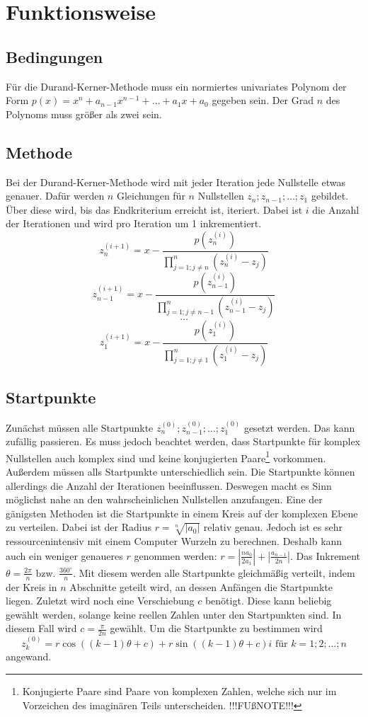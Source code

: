 \documentclass[12pt]{article}
\begin{document}
\section{Funktionsweise}
\subsection{Bedingungen}
Für die Durand-Kerner-Methode muss ein normiertes univariates Polynom der Form $p(x) = x^n + a_{n-1} x^{n-1} + \dots + a_1 x + a_0$ gegeben sein. Der Grad $n$ des Polynoms muss größer als zwei sein.

\subsection{Methode}
Bei der Durand-Kerner-Methode wird mit jeder Iteration jede Nullstelle etwas genauer. Dafür werden $n$ Gleichungen für $n$ Nullstellen $z_n;z_{n-1};\dots;z_1$ gebildet. Über diese wird, bis das Endkriterium erreicht ist, iteriert. Dabei ist $i$ die Anzahl der Iterationen und wird pro Iteration um 1 inkrementiert.
\[z_n^{(i+1)} = x - \frac{p(z_n^{(i)})}{\prod_{j=1;j\neq n}^{n}(z_n^{(i)}-z_j)}\]
\[z_{n-1}^{(i+1)} = x - \frac{p(z_{n-1}^{(i)})}{\prod_{j=1;j\neq n-1}^{n}(z_{n-1}^{(i)}-z_j)}\]
\vspace{0.25mm}
\[\dots\]
\[z_{1}^{(i+1)} = x - \frac{p(z_{1}^{(i)})}{\prod_{j=1;j\neq 1}^{n}(z_{1}^{(i)}-z_j)}\]
\subsection{Startpunkte}
Zunächst müssen alle Startpunkte $z_n^{(0)};z_{n-1}^{(0)};\dots;z_1^{(0)}$ gesetzt werden. Das kann zufällig passieren. Es muss jedoch beachtet werden, dass Startpunkte für komplex Nullstellen auch komplex sind und keine konjugierten Paare\footnote{Konjugierte Paare sind Paare von komplexen Zahlen, welche sich nur im Vorzeichen des imaginären Teils unterscheiden. !!!FUßNOTE!!!} vorkommen. Außerdem müssen alls Startpunkte unterschiedlich sein. Die Startpunkte können allerdings die Anzahl der Iterationen beeinflussen. Deswegen macht es Sinn möglichst nahe an den wahrscheinlichen Nullstellen anzufangen. Eine der gänigsten Methoden ist die Startpunkte in einem Kreis auf der komplexen Ebene zu verteilen. Dabei ist der Radius $r = \sqrt[n]{|a_0|}$ relativ genau. Jedoch ist es sehr ressourcenintensiv mit einem Computer Wurzeln zu berechnen. Deshalb kann auch ein weniger genaueres $r$ genommen werden: $r = |\frac{na_0}{2a_1}| + |\frac{a_{n-1}}{2n}|$.
Das Inkrement $\theta = \frac{2\pi}{n} \text{ bzw. } \frac{360^\circ}{n}$. Mit diesem werden alle Startpunkte gleichmäßig verteilt, indem der Kreis in $n$ Abschnitte geteilt wird, an dessen Anfängen die Startpunkte liegen. Zuletzt wird noch eine Verschiebung $c$ benötigt. Diese kann beliebig gewählt werden, solange keine reellen Zahlen unter den Startpunkten sind. In diesem Fall wird $c = \frac{\pi}{2n}$ gewählt.
Um die Startpunkte zu bestimmen wird 
\[z_{k}^{(0)} = r\cos((k-1)\theta+c)+r\sin((k-1)\theta+c)i \text{ für } k=1;2;\dots;n\]
 angewand.
\end{document}

